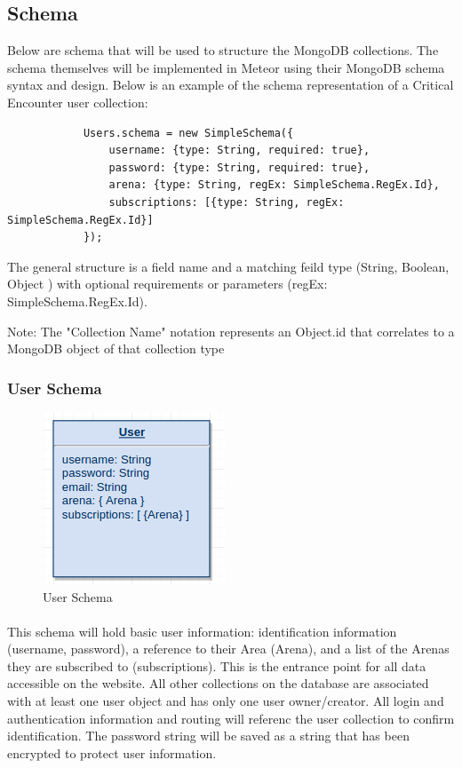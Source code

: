 \documentclass[12pt,a4paper]{report}
\begin{document}
	\subsection{Schema}
		Below are schema that will be used to structure the MongoDB collections. The schema themselves will be implemented in Meteor using their MongoDB schema syntax and design. Below is an example of the schema representation of a Critical Encounter user collection:
		
		\begin{lstlisting}
			Users.schema = new SimpleSchema({
				username: {type: String, required: true},
				password: {type: String, required: true},
				arena: {type: String, regEx: SimpleSchema.RegEx.Id},
				subscriptions: [{type: String, regEx: SimpleSchema.RegEx.Id}]
			});
		\end{lstlisting}
		
		The general structure is a field name and a matching feild type (String, Boolean, Object ) with optional requirements or parameters (regEx: SimpleSchema.RegEx.Id).
		
		Note: The { "Collection Name" } notation represents an Object.id that correlates to a MongoDB object of that collection type
		\subsubsection{User Schema}
			\begin{figure}[h]
				\centering
				\includegraphics[scale=.75]{schema-user}
				\caption{User Schema}
				\label{fig: User Schema }
			\end{figure}
			
		\paragraph{}This schema will hold basic user information: identification information (username, password), a reference to their Area (Arena), and a list of the Arenas they are subscribed to (subscriptions). This is the entrance point for all data accessible on the website. All other collections on the database are associated with at least one user object and has only one user owner/creator. All login and authentication information and routing will referenc the user collection to confirm identification. The password string will be saved as a string that has been encrypted to protect user information.
\end{document}
